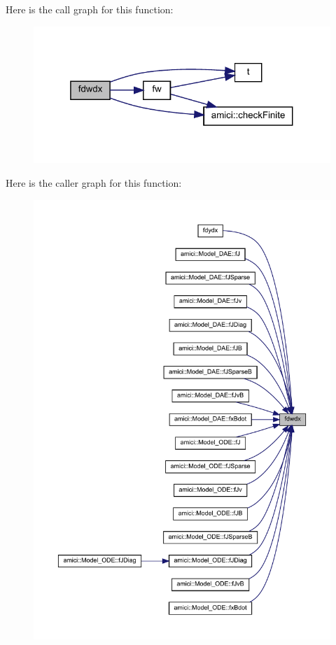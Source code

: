 Here is the call graph for this function\+:
\nopagebreak
\begin{figure}[H]
\begin{center}
\leavevmode
\includegraphics[width=319pt]{classamici_1_1_model_a29b16aa0c3fb0254fb248c003473d5f9_cgraph}
\end{center}
\end{figure}
Here is the caller graph for this function\+:
\nopagebreak
\begin{figure}[H]
\begin{center}
\leavevmode
\includegraphics[width=350pt]{classamici_1_1_model_a29b16aa0c3fb0254fb248c003473d5f9_icgraph}
\end{center}
\end{figure}
\mbox{\label{classamici_1_1_model_a991a9aab9f325625a35179fa601fa426}} 

